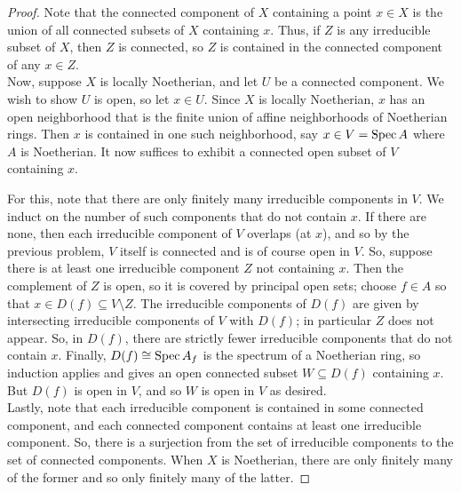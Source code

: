 \begin{proof}
	Note that the connected component of $X$ containing a point $x \in X$ is the union of all connected subsets of $X$ containing $x$. Thus, if $Z$ is any irreducible subset of $X$, then $Z$ is connected, so $Z$ is contained in the connected component of any $x \in Z$. \\
	
	Now, suppose $X$ is locally Noetherian, and let $U$ be a connected component. We wish to show $U$ is open, so let $x \in U$. Since $X$ is locally Noetherian, $x$ has an open neighborhood that is the finite union of affine neighborhoods of Noetherian rings. Then $x$ is contained in one such neighborhood, say $x \in V = \operatorname{Spec} A$ where $A$ is Noetherian. It now suffices to exhibit a connected open subset of $V$ containing $x$.
	
	For this, note that there are only finitely many irreducible components in $V$. We induct on the number of such components that do not contain $x$. If there are none, then each irreducible component of $V$ overlaps (at $x$), and so by the previous problem, $V$ itself is connected and is of course open in $V$. So, suppose there is at least one irreducible component $Z$ not containing $x$. Then the complement of $Z$ is open, so it is covered by principal open sets; choose $f \in A$ so that $x \in D(f) \subseteq V \setminus Z$. The irreducible components of $D(f)$ are given by intersecting irreducible components of $V$ with $D(f)$; in particular $Z$ does not appear. So, in $D(f)$, there are strictly fewer irreducible components that do not contain $x$. Finally, $D(f) \cong \operatorname{Spec} A_f$ is the spectrum of a Noetherian ring, so induction applies and gives an open connected subset $W \subseteq D(f)$ containing $x$. But $D(f)$ is open in $V$, and so $W$ is open in $V$ as desired. \\
	
	Lastly, note that each irreducible component is contained in some connected component, and each connected component contains at least one irreducible component. So, there is a surjection from the set of irreducible components to the set of connected components. When $X$ is Noetherian, there are only finitely many of the former and so only finitely many of the latter.
\end{proof}

